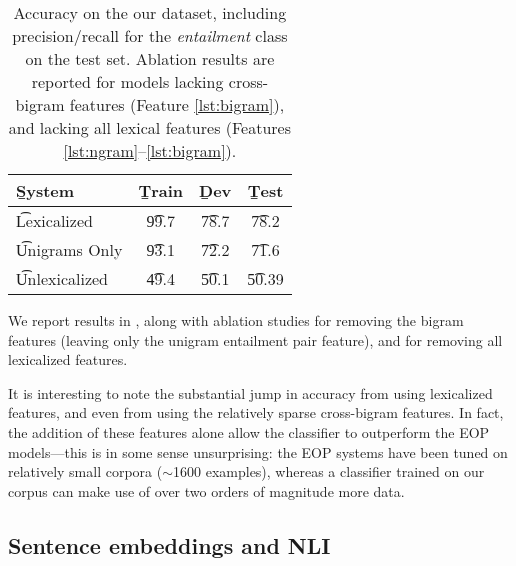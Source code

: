 %
%

\begin{table}
\begin{center}
\begin{tabular}{l@{\hskip \colspaceL}c@{\hskip \colspaceL}c@{\hskip \colspaceS}c}
\hline
\b{System} & \b{Train} & \b{Dev} & \b{Test} \\
\hline
\t{Lexicalized}            & \t{99.7} & \t{78.7} & \t{78.2} \\
\t{Unigrams Only}          & \t{93.1} & \t{72.2} & \t{71.6} \\
\t{Unlexicalized}          & \t{49.4} & \t{50.1} & \t{50.39} \\
\hline
\end{tabular}
\end{center}
\caption{
\label{tab:bowresults}
Accuracy on the our dataset, including precision/recall for the
  \textit{entailment} class on the test set.
Ablation results are reported for models lacking cross-bigram features 
  (Feature \ref{lst:bigram}), and lacking all lexical
  features (Features \ref{lst:ngram}--\ref{lst:bigram}).
}
\end{table}
%
%


We report results in , along with ablation studies for removing
  the bigram features (leaving only the unigram entailment pair feature),
  and for removing all lexicalized features.

It is interesting to note the substantial jump in accuracy from using
  lexicalized features, and even from using the relatively sparse
  cross-bigram features.
In fact, the addition of these features alone allow the classifier to
  outperform the EOP models---this is in some sense unsurprising:
  the EOP systems have been tuned on relatively small corpora
  ($\sim$1600 examples), whereas a classifier trained on our corpus can make use of
  over two orders of magnitude more data.

\subsection{Sentence embeddings and NLI}\label{sentence-embedding}

